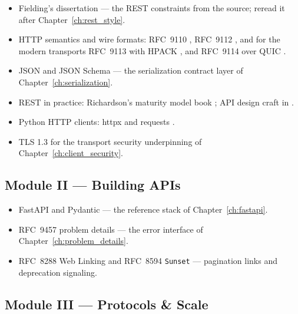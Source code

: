 \begin{itemize}
  \item Fielding's dissertation \cite{fielding2000rest} --- the REST
        constraints from the source; reread it after Chapter~\ref{ch:rest_style}.
  \item HTTP semantics and wire formats: RFC~9110 \cite{rfc9110},
        RFC~9112 \cite{rfc9112}, and for the modern transports RFC~9113
        \cite{rfc9113} with HPACK \cite{rfc7541}, and RFC~9114 over QUIC
        \cite{rfc9114,rfc9000}.
  \item JSON \cite{rfc8259} and JSON Schema \cite{jsonschemadocs} --- the
        serialization contract layer of Chapter~\ref{ch:serialization}.
  \item REST in practice: Richardson's maturity model book
        \cite{richardson2013restful}; API design craft in
        \cite{gehl2021apidesign}.
  \item Python HTTP clients: httpx \cite{httpxdocs} and requests
        \cite{requestsdocs}.
  \item TLS 1.3 \cite{rfc8446} for the transport security underpinning of
        Chapter~\ref{ch:client_security}.
\end{itemize}

\subsection*{Module II --- Building APIs}

\begin{itemize}
  \item FastAPI \cite{fastapidocs} and Pydantic \cite{pydanticdocs} ---
        the reference stack of Chapter~\ref{ch:fastapi}.
  \item RFC~9457 problem details \cite{rfc9457} --- the error interface of
        Chapter~\ref{ch:problem_details}.
  \item RFC~8288 Web Linking \cite{rfc8288} and RFC~8594 \texttt{Sunset}
        \cite{rfc8594} --- pagination links and deprecation signaling.
\end{itemize}

\subsection*{Module III --- Protocols \& Scale}

